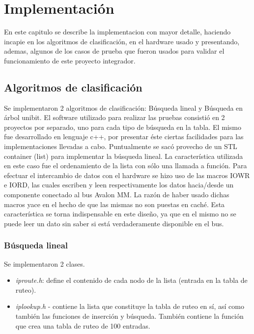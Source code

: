 \chapter{Implementación}

En este capitulo se describe la implementacion con mayor detalle, haciendo incapie en los algoritmos de clasificación, en el hardware usado y presentando, ademas, algunos de los casos de prueba que fueron usados para validar el funcionamiento de este proyecto integrador.


\section{Algoritmos de clasificación}


Se implementaron 2 algoritmos de clasificación: Búsqueda lineal y Búsqueda en árbol unibit. El software utilizado para realizar las pruebas consistió en 2 proyectos por separado, uno para cada tipo de búsqueda en la tabla. El mismo fue desarrollado en lenguaje c++, por presentar éste ciertas facilidades para las implementaciones llevadas a cabo. Puntualmente se sacó provecho de un STL container (list) para implementar la búsqueda lineal. La característica utilizada en este caso fue el ordenamiento de la lista con sólo una llamada a función.
Para efectuar el intercambio de datos con el hardware se hizo uso de las macros IOWR e IORD, las cuales escriben y leen respectivamente los datos hacia/desde un componente conectado al bus Avalon MM. La razón de haber usado dichas macros yace en el hecho de que las mismas no son puestas en caché. Esta característica se torna indispensable en este diseño, ya que en el mismo no se puede leer un dato sin saber si está verdaderamente disponible en el bus.


\subsection {Búsqueda lineal}

Se implementaron 2 clases. 

\begin{itemize}
	\item \textit{iproute.h}: define el contenido de cada nodo de la lista (entrada en la tabla de ruteo).
	\item \textit{iplookup.h} -  contiene la lista que constituye la tabla de ruteo en sí, así como también las funciones de inserción y búsqueda. También contiene la función que crea una tabla de ruteo de 100 entradas.
\end{itemize}

